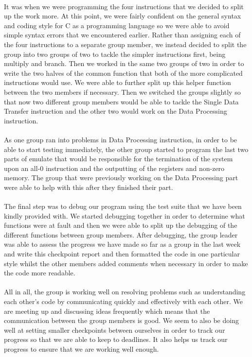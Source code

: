 \documentclass[11pt]{article}
\begin{document}
\paragraph{}
It was when we were programming the four instructions that we decided to split up the work more. At this point, we were fairly confident on the general syntax and coding style for C as a programming language so we were able to avoid simple syntax errors that we encountered earlier.  Rather than assigning each of the four instructions to a separate group member, we instead decided to split the group into two groups of two to tackle the simpler instructions first, being multiply and branch. Then we worked in the same two groups of two in order to write the two halves of the common function that both of the more complicated instructions would use. We were able to further split up this helper function between the two members if necessary. Then we switched the groups slightly so that now two different group members would be able to tackle the Single Data Transfer instruction and the other two would work on the Data Processing instruction. 
\paragraph{}
As one group ran into problems in Data Processing instruction, in order to be able to start testing immediately, the other group started to program the last two parts of emulate that would be responsible for the termination of the system upon an all-0 instruction and the outputting of the registers and non-zero memory. The group that were previously working on the Data Processing part were able to help with this after they finished their part.
\paragraph{}
The final step was to debug our program using the test suite that we have been kindly provided with. We started debugging together in order to determine what functions were at fault and then we were able to split up the debugging of the different functions between group members. After debugging, the group leader was able to assess the progress we have made so far as a group in the last week and write this checkpoint report and then formatted the code in one particular style whilst the other members added comments when necessary in order to make the code more readable.

\paragraph{}
All in all, the group is working well on resolving problems such as understanding each other's code by communicating quickly and effectively with each other. We are meeting up and discussing ideas frequently which means that the communication between the group members is good. We seem to also be doing well at setting smaller checkpoints between ourselves in order to track our progress so that we are able to keep to deadlines. It also helps us track our progress to ensure that we are working well enough. 
\end{document}
